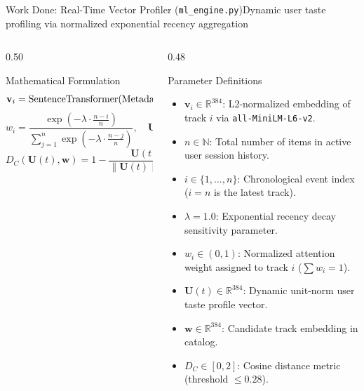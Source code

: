 \documentclass[aspectratio=169,10pt]{beamer}
\begin{document}
\begin{frame}{Work Done: Real-Time Vector Profiler (\texttt{ml\_engine.py})}{Dynamic user taste profiling via normalized exponential recency aggregation}
    \begin{columns}[T]
        \begin{column}{0.50\textwidth}
            \begin{block}{Mathematical Formulation}
                \fontsize{7pt}{9pt}\selectfont
                $$\mathbf{v}_i = \text{SentenceTransformer}(\text{Metadata}_i) \in \mathbb{R}^{384} \quad \text{\textbf{[2]}}$$
                $$w_i = \frac{\exp(-\lambda \cdot \frac{n - i}{n})}{\sum_{j=1}^n \exp(-\lambda \cdot \frac{n - j}{n})}, \quad \mathbf{U}(t) = \frac{\sum_{i=1}^n w_i \mathbf{v}_i}{\left\|\sum_{i=1}^n w_i \mathbf{v}_i\right\|_2}$$
                $$D_C(\mathbf{U}(t), \mathbf{w}) = 1 - \frac{\mathbf{U}(t) \cdot \mathbf{w}}{\|\mathbf{U}(t)\|_2 \|\mathbf{w}\|_2}$$
            \end{block}
        \end{column}

        \begin{column}{0.48\textwidth}
            \begin{block}{Parameter Definitions}
                \fontsize{6pt}{7.5pt}\selectfont
                \begin{itemize}
                    \item $\mathbf{v}_i \in \mathbb{R}^{384}$: L2-normalized embedding of track $i$ via \texttt{all-MiniLM-L6-v2}.
                    \item $n \in \mathbb{N}$: Total number of items in active user session history.
                    \item $i \in \{1, \dots, n\}$: Chronological event index ($i=n$ is the latest track).
                    \item $\lambda = 1.0$: Exponential recency decay sensitivity parameter.
                    \item $w_i \in (0,1)$: Normalized attention weight assigned to track $i$ ($\sum w_i = 1$).
                    \item $\mathbf{U}(t) \in \mathbb{R}^{384}$: Dynamic unit-norm user taste profile vector.
                    \item $\mathbf{w} \in \mathbb{R}^{384}$: Candidate track embedding in catalog.
                    \item $D_C \in [0, 2]$: Cosine distance metric (threshold $\le 0.28$).
                \end{itemize}
            \end{block}
        \end{column}
    \end{columns}
\end{frame}
\end{document}

